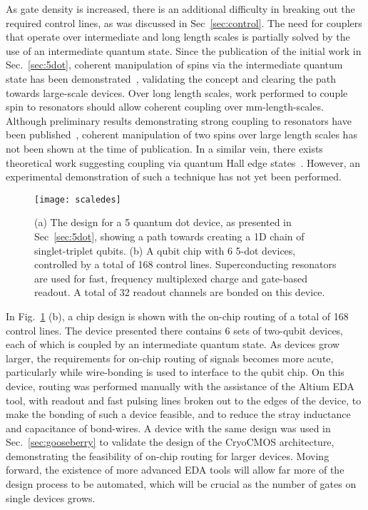 As gate density is increased, there is an additional difficulty in breaking out the required control lines, as was discussed in Sec~\ref{sec:control}. The need for
couplers that operate over intermediate and long length scales is partially solved by the use of an intermediate quantum state. Since the publication of the initial work in
Sec.~\ref{sec:5dot}, coherent manipulation of spins via the intermediate quantum state has been demonstrated~\cite{s41467-019-09194-x}, validating the concept
and clearing the path towards large-scale devices. Over long length scales, work performed to couple spin to resonators should allow coherent coupling over
\si{\milli\meter}-length-scales. Although preliminary results demonstrating strong coupling to resonators have been published~\cite{nature11559,2019arXiv190500776B},
coherent manipulation of two spins over large length scales has not been shown at the time of publication. In a similar vein, there exists theoretical work suggesting
coupling via quantum Hall edge states~\cite{dohertyqhe}. However, an experimental demonstration of such a technique has not yet been performed.

\begin{figure}
    \texttt{[image: scaledes]}
    \caption[Scalable qubit designs]{\label{fig:scaledes} (a) The design for a 5 quantum dot device, as presented in Sec~\ref{sec:5dot}, showing a path towards creating a 1D
    chain of singlet-triplet qubits. (b) A qubit chip with 6 5-dot devices, controlled by a total of 168 control lines. Superconducting resonators are used for fast,
    frequency multiplexed charge and gate-based readout. A total of 32 readout channels are bonded on this device.}
\end{figure}

In Fig.~\ref{fig:scaledes} (b), a chip design is shown with the on-chip routing of a total of 168 control lines. The device presented there contains 6 sets of two-qubit devices,
each of which is coupled by an intermediate quantum state. As devices grow larger, the requirements for on-chip routing of signals becomes more acute, particularly
while wire-bonding is used to interface to the qubit chip. On this device, routing was performed manually with the assistance of the Altium EDA tool, with readout and
fast pulsing lines broken out to the edges of the device, to make the bonding of such a device feasible, and to reduce the stray inductance and capacitance of bond-wires.
A device with the same design was used in Sec.~\ref{sec:gooseberry} to validate the design of the CryoCMOS architecture, demonstrating the feasibility of on-chip routing
for larger devices. Moving forward, the existence of more advanced EDA tools will allow far more of the design process to be automated, which will be crucial as the
number of gates on single devices grows.

